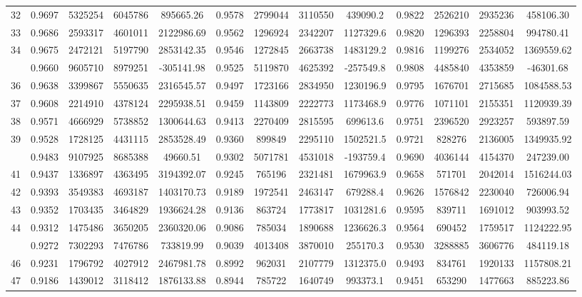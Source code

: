 \documentclass[
  12pt,
]{article}
\begin{document}
\begin{longtable}[t]{lcccccccccccc}
32 & 0.9697 & 5325254 & 6045786 & 895665.26 & 0.9578 & 2799044 & 3110550 & 439090.2 & 0.9822 & 2526210 & 2935236 & 458106.30\\
33 & 0.9686 & 2593317 & 4601011 & 2122986.69 & 0.9562 & 1296924 & 2342207 & 1127329.6 & 0.9820 & 1296393 & 2258804 & 994780.41\\
34 & 0.9675 & 2472121 & 5197790 & 2853142.35 & 0.9546 & 1272845 & 2663738 & 1483129.2 & 0.9816 & 1199276 & 2534052 & 1369559.62\\
\addlinespace
35 & 0.9660 & 9605710 & 8979251 & -305141.98 & 0.9525 & 5119870 & 4625392 & -257549.8 & 0.9808 & 4485840 & 4353859 & -46301.68\\
36 & 0.9638 & 3399867 & 5550635 & 2316545.57 & 0.9497 & 1723166 & 2834950 & 1230196.9 & 0.9795 & 1676701 & 2715685 & 1084588.53\\
37 & 0.9608 & 2214910 & 4378124 & 2295938.51 & 0.9459 & 1143809 & 2222773 & 1173468.9 & 0.9776 & 1071101 & 2155351 & 1120939.39\\
38 & 0.9571 & 4666929 & 5738852 & 1300644.63 & 0.9413 & 2270409 & 2815595 & 699613.6 & 0.9751 & 2396520 & 2923257 & 593897.59\\
39 & 0.9528 & 1728125 & 4431115 & 2853528.49 & 0.9360 & 899849 & 2295110 & 1502521.5 & 0.9721 & 828276 & 2136005 & 1349935.92\\
\addlinespace
40 & 0.9483 & 9107925 & 8685388 & 49660.51 & 0.9302 & 5071781 & 4531018 & -193759.4 & 0.9690 & 4036144 & 4154370 & 247239.00\\
41 & 0.9437 & 1336897 & 4363495 & 3194392.07 & 0.9245 & 765196 & 2321481 & 1679963.9 & 0.9658 & 571701 & 2042014 & 1516244.03\\
42 & 0.9393 & 3549383 & 4693187 & 1403170.73 & 0.9189 & 1972541 & 2463147 & 679288.4 & 0.9626 & 1576842 & 2230040 & 726006.94\\
43 & 0.9352 & 1703435 & 3464829 & 1936624.28 & 0.9136 & 863724 & 1773817 & 1031281.6 & 0.9595 & 839711 & 1691012 & 903993.52\\
44 & 0.9312 & 1475486 & 3650205 & 2360320.06 & 0.9086 & 785034 & 1890688 & 1236626.3 & 0.9564 & 690452 & 1759517 & 1124222.95\\
\addlinespace
45 & 0.9272 & 7302293 & 7476786 & 733819.99 & 0.9039 & 4013408 & 3870010 & 255170.3 & 0.9530 & 3288885 & 3606776 & 484119.18\\
46 & 0.9231 & 1796792 & 4027912 & 2467981.78 & 0.8992 & 962031 & 2107779 & 1312375.0 & 0.9493 & 834761 & 1920133 & 1157808.21\\
47 & 0.9186 & 1439012 & 3118412 & 1876133.88 & 0.8944 & 785722 & 1640749 & 993373.1 & 0.9451 & 653290 & 1477663 & 885223.86\\

\end{longtable}
\end{document}
